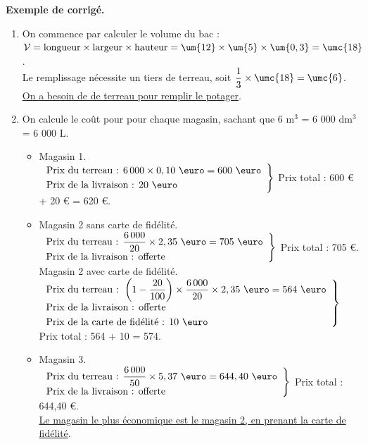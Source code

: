 \begin{activite}
\begin{QCM}
   \end{QCM}
   
   \bigskip
   
   \textcolor{G1}{
   {\bf Exemple de corrigé.} \smallskip
      \begin{enumerate}
         \item On commence par calculer le volume du bac  : \\
      $\mathcal{V} =\text{longueur}\times\text{largeur}\times\text{hauteur} =\um{12}\times\um{5}\times\um{0,3} =\umc{18}$. \\ [0.5mm]
            Le remplissage nécessite un tiers de terreau, soit $\dfrac13\times\umc{18} =\umc{6}$. \\ [0.5mm]
            \uline{On a besoin de  de terreau pour remplir le potager}.
         \item On calcule le coût pour  pour chaque magasin, sachant que 6 m$^3$ = 6 000 dm$^3$ = 6 000 L.  
            \begin{itemize}
               \item Magasin 1. \\ [1mm]
                  $\Imp{\text{Prix du terreau : } 6\,000\times0,10\text{ \euro}=600\text{ \euro}}{\text{Prix de la livraison : }20\text{ \euro}}$ Prix total : 600 \euro{} + 20 \euro{} = 620 \euro.
                  \item Magasin 2 sans carte de fidélité. \\
                  $\Imp{\text{Prix du terreau : } \dfrac{6\,000}{20}\times2,35\text{ \euro}=705\text{ \euro}}{\text{Prix de la livraison : offerte}}$ Prix total : 705 \euro. \\ [1mm]
                  Magasin 2 avec carte de fidélité. \\
                  $\Impl{\text{Prix du terreau : } \left(1-\dfrac{20}{100}\right)\times\dfrac{6\,000}{20}\times2,35\text{ \euro}=564\text{ \euro}}{\text{Prix de la livraison : offerte}}{\text{Prix de la carte de fidélité : 10 \euro}}$ Prix total : 564\text{ \euro} + 10\text{ \euro} = 574\text{ \euro}.
                 \item Magasin 3. \\
                  $\Imp{\text{Prix du terreau : } \dfrac{6\,000}{50}\times5,37\text{ \euro}=644,40\text{ \euro}}{\text{Prix de la livraison : offerte}}$ Prix total : 644,40 \euro. \\ [1mm]
                  \uline{Le magasin le plus économique est le magasin 2, en prenant la carte de fidélité}.
               \end{itemize}
      \end{enumerate}}
\end{activite}

